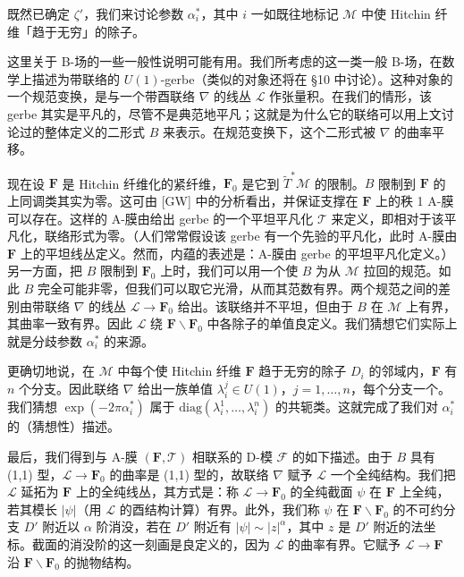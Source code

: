 \documentclass[11pt,a4paper]{article}
\begin{document}
既然已确定 $\zeta'$，我们来讨论参数 $\alpha_i^*$，其中 $i$ 一如既往地标记 $\mathcal{M}$ 中使 Hitchin 纤维「趋于无穷」的除子。

这里关于 B-场的一些一般性说明可能有用。我们所考虑的这一类一般 B-场，在数学上描述为带联络的 $U(1)$-gerbe（类似的对象还将在 §10 中讨论）。这种对象的一个规范变换，是与一个带酉联络 $\nabla$ 的线丛 $\mathcal{L}$ 作张量积。在我们的情形，该 gerbe 其实是平凡的，尽管不是典范地平凡；这就是为什么它的联络可以用上文讨论过的整体定义的二形式 $B$ 来表示。在规范变换下，这个二形式被 $\nabla$ 的曲率平移。

现在设 $\boldsymbol{F}$ 是 Hitchin 纤维化的紧纤维，$\boldsymbol{F}_0$ 是它到 $\widetilde{T}^*\mathcal{M}$ 的限制。$B$ 限制到 $\boldsymbol{F}$ 的上同调类其实为零。这可由 [GW] 中的分析看出，并保证支撑在 $\boldsymbol{F}$ 上的秩 1 A-膜可以存在。这样的 A-膜由给出 gerbe 的一个平坦平凡化 $\mathcal{T}$ 来定义，即相对于该平凡化，联络形式为零。（人们常常假设该 gerbe 有一个先验的平凡化，此时 A-膜由 $\boldsymbol{F}$ 上的平坦线丛定义。然而，内蕴的表述是：A-膜由 gerbe 的平坦平凡化定义。）另一方面，把 $B$ 限制到 $\boldsymbol{F}_0$ 上时，我们可以用一个使 $B$ 为从 $\mathcal{M}$ 拉回的规范。如此 $B$ 完全可能非零，但我们可以取它光滑，从而其范数有界。两个规范之间的差别由带联络 $\nabla$ 的线丛 $\mathcal{L}\to\boldsymbol{F}_0$ 给出。该联络并不平坦，但由于 $B$ 在 $\mathcal{M}$ 上有界，其曲率一致有界。因此 $\mathcal{L}$ 绕 $\boldsymbol{F}\backslash\boldsymbol{F}_0$ 中各除子的单值良定义。我们猜想它们实际上就是分歧参数 $\alpha_i^*$ 的来源。

更确切地说，在 $\mathcal{M}$ 中每个使 Hitchin 纤维 $\boldsymbol{F}$ 趋于无穷的除子 $D_i$ 的邻域内，$\boldsymbol{F}$ 有 $n$ 个分支。因此联络 $\nabla$ 给出一族单值 $\lambda_i^j\in U(1)$，$j=1,\dots,n$，每个分支一个。我们猜想 $\exp(-2\pi\alpha_i^*)$ 属于 $\mathrm{diag}(\lambda_i^1,\dots,\lambda_i^n)$ 的共轭类。这就完成了我们对 $\alpha_i^*$ 的（猜想性）描述。

最后，我们得到与 A-膜 $(\boldsymbol{F},\mathcal{T})$ 相联系的 D-模 $\mathcal{F}$ 的如下描述。由于 $B$ 具有 (1,1) 型，$\mathcal{L}\to\boldsymbol{F}_0$ 的曲率是 (1,1) 型的，故联络 $\nabla$ 赋予 $\mathcal{L}$ 一个全纯结构。我们把 $\mathcal{L}$ 延拓为 $\boldsymbol{F}$ 上的全纯线丛，其方式是：称 $\mathcal{L}\to\boldsymbol{F}_0$ 的全纯截面 $\psi$ 在 $\boldsymbol{F}$ 上全纯，若其模长 $|\psi|$（用 $\mathcal{L}$ 的酉结构计算）有界。此外，我们称 $\psi$ 在 $\boldsymbol{F}\backslash\boldsymbol{F}_0$ 的不可约分支 $D'$ 附近以 $\alpha$ 阶消没，若在 $D'$ 附近有 $|\psi|\sim|z|^{\alpha}$，其中 $z$ 是 $D'$ 附近的法坐标。截面的消没阶的这一刻画是良定义的，因为 $\mathcal{L}$ 的曲率有界。它赋予 $\mathcal{L}\to\boldsymbol{F}$ 沿 $\boldsymbol{F}\backslash\boldsymbol{F}_0$ 的抛物结构。
\end{document}
